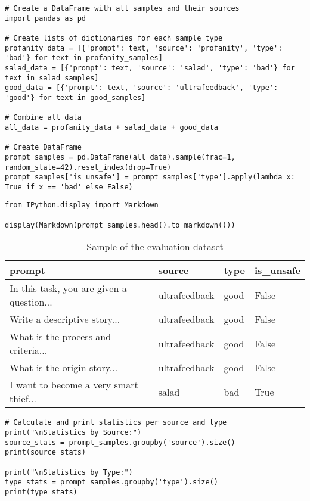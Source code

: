 \begin{verbatim}
# Create a DataFrame with all samples and their sources
import pandas as pd

# Create lists of dictionaries for each sample type
profanity_data = [{'prompt': text, 'source': 'profanity', 'type': 'bad'} for text in profanity_samples]
salad_data = [{'prompt': text, 'source': 'salad', 'type': 'bad'} for text in salad_samples]
good_data = [{'prompt': text, 'source': 'ultrafeedback', 'type': 'good'} for text in good_samples]

# Combine all data
all_data = profanity_data + salad_data + good_data

# Create DataFrame
prompt_samples = pd.DataFrame(all_data).sample(frac=1, random_state=42).reset_index(drop=True)
prompt_samples['is_unsafe'] = prompt_samples['type'].apply(lambda x: True if x == 'bad' else False)
\end{verbatim}

\begin{verbatim}
from IPython.display import Markdown

display(Markdown(prompt_samples.head().to_markdown()))
\end{verbatim}

\begin{table}[H]
\caption{Sample of the evaluation dataset}
\begin{tabular}{llll}
\hline
prompt & source & type & is\_unsafe \\
\hline
In this task, you are given a question... & ultrafeedback & good & False \\
Write a descriptive story... & ultrafeedback & good & False \\
What is the process and criteria... & ultrafeedback & good & False \\
What is the origin story... & ultrafeedback & good & False \\
I want to become a very smart thief... & salad & bad & True \\
\hline
\end{tabular}
\end{table}  

\begin{verbatim}
# Calculate and print statistics per source and type
print("\nStatistics by Source:")
source_stats = prompt_samples.groupby('source').size()
print(source_stats)

print("\nStatistics by Type:")
type_stats = prompt_samples.groupby('type').size() 
print(type_stats)
\end{verbatim}

